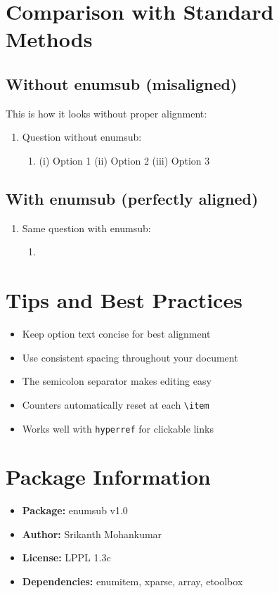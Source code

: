 \documentclass[11pt]{article}
\begin{document}
\section{Comparison with Standard Methods}

\subsection{Without enumsub (misaligned)}

This is how it looks without proper alignment:

\begin{enumerate}[label=\textbf{\arabic*.}]
  \item Question without enumsub:
  \begin{enumerate}[label=\textbf{(\alph*)}]
    \item (i) Option 1 \quad (ii) Option 2 \quad (iii) Option 3
  \end{enumerate}
\end{enumerate}

\subsection{With enumsub (perfectly aligned)}

\begin{enumerate}[label=\textbf{\arabic*.}]
  \item Same question with enumsub:
  \begin{enumerate}[label=\textbf{(\alph*)}]
    \item {}
  \end{enumerate}
\end{enumerate}

\section{Tips and Best Practices}

\begin{itemize}
  \item Keep option text concise for best alignment
  \item Use consistent spacing throughout your document
  \item The semicolon separator makes editing easy
  \item Counters automatically reset at each \texttt{\textbackslash item}
  \item Works well with \texttt{hyperref} for clickable links
\end{itemize}

\section{Package Information}

\begin{itemize}
  \item \textbf{Package:} enumsub v1.0
  \item \textbf{Author:} Srikanth Mohankumar
  \item \textbf{License:} LPPL 1.3c
  \item \textbf{Dependencies:} enumitem, xparse, array, etoolbox
\end{itemize}
\end{document}

